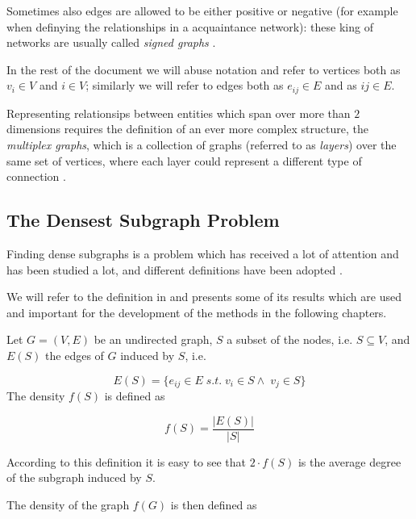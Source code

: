Sometimes also edges are allowed to be either positive or negative (for example when
definying the relationships in a acquaintance network): these king of networks
are usually called \emph{signed graphs} \cite{Newman2018}.

\bigskip

In the rest of the document we will abuse notation and refer to vertices both
as $v_{i} \in V $ and $i \in V$; similarly we will refer to edges both as
$e_{ij} \in E $ and as $ij \in E$.

\bigskip

Representing relationsips between entities which span over more than $2$
dimensions requires the definition of an ever more complex structure, the
\emph{multiplex graphs}, which is a collection of graphs (referred to as
\emph{layers}) over the same set of vertices, where each layer could represent
a different type of connection \cite{Newman2018}.

\subsection{The Densest Subgraph Problem}%
\label{sub:densest_subgraphs}

Finding dense subgraphs is a problem which has received a lot of attention and
has been studied a lot, and different definitions have been adopted
\cite{charikar2000greedy}\cite{asahiro1995finding}\cite{asahiro2000greedily}
\cite{feige1997densest}.

We will refer to the definition in \cite{charikar2000greedy} and presents some
of its results which are used and important for the development of the methods
in the following chapters.

\medskip

Let $G = (V, E)$ be an undirected graph, $S$ a subset of the nodes, i.e. $S
	\subseteq V$, and $E(S)$ the edges of $G$ induced by $S$, i.e.

\begin{equation*}
	E(S) = \{e_{ij} \in E \; s.t. \; v_i \in S \land \; v_j \in S\}
\end{equation*}
The density $f(S)$ is defined as

\begin{equation}
	f(S) = \frac{|E(S)|}{|S|}
\end{equation}

According to this definition it is easy to see that $2 \cdot f(S)$ is the
average degree of the subgraph induced by $S$.

The density of the graph $f(G)$ is then defined as

